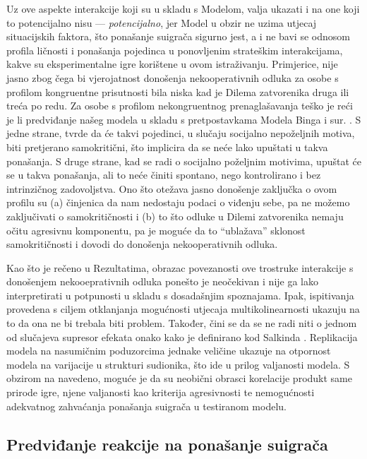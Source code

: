 \documentclass[a4paper, 12pt]{report}
\begin{document}
Uz ove aspekte interakcije koji su u skladu s Modelom, valja ukazati i na one
koji to potencijalno nisu --- \emph{potencijalno}, jer Model u obzir ne uzima
utjecaj situacijskih faktora, što ponašanje suigrača sigurno jest, a i ne bavi
se odnosom profila ličnosti i ponašanja pojedinca u ponovljenim strateškim
interakcijama, kakve su eksperimentalne igre korištene u ovom istraživanju.
Primjerice, nije jasno zbog čega bi vjerojatnost donošenja nekooperativnih
odluka za osobe s profilom kongruentne prisutnosti bila niska kad je Dilema
zatvorenika druga ili treća po redu. Za osobe s profilom nekongruentnog
prenaglašavanja teško je reći je li predviđanje našeg modela u skladu s
pretpostavkama Modela Binga i sur. \citeyearpar{bing2007integrating}.
S jedne strane, \citet{bing2007integrating} tvrde da će takvi pojedinci, u
slučaju socijalno nepoželjnih motiva, biti pretjerano samokritični,  što
implicira da se neće lako upuštati u takva ponašanja. S druge strane, kad se
radi o socijalno poželjnim motivima, upuštat će se u takva ponašanja, ali to neće
činiti spontano, nego kontrolirano i bez intrinzičnog zadovoljstva. 
Ono što otežava jasno donošenje zaključka o ovom profilu su (a) činjenica da nam
nedostaju podaci o viđenju sebe, pa ne možemo zaključivati o samokritičnosti i
(b) to što odluke u Dilemi zatvorenika nemaju očitu agresivnu komponentu, pa je
moguće da to  \enquote{ublažava} sklonost samokritičnosti i dovodi do
donošenja nekooperativnih odluka.

Kao što je rečeno u Rezultatima, obrazac povezanosti ove trostruke interakcije s
donošenjem nekooeprativnih odluka ponešto je neočekivan i nije ga lako
interpretirati u potpunosti u skladu s dosadašnjim spoznajama. 
Ipak, ispitivanja provedena s ciljem otklanjanja mogućnosti utjecaja
multikolinearnosti ukazuju na to da ona ne bi trebala biti problem. 
Također, čini se da se ne radi niti o jednom od slučajeva supresor efekata 
onako kako je definirano kod Salkinda \citeyearpar{salkind2007encyclopedia}.  
Replikacija modela na nasumičnim poduzorcima jednake veličine ukazuje na
otpornost modela na varijacije u strukturi sudionika, što ide u prilog
valjanosti modela. S obzirom na navedeno, moguće je da su neobični obrasci
korelacije produkt same prirode igre, njene valjanosti kao kriterija
agresivnosti te nemogućnosti adekvatnog zahvaćanja ponašanja suigrača u
testiranom modelu.

\subsection{Predviđanje reakcije na ponašanje suigrača} 
\end{document}
